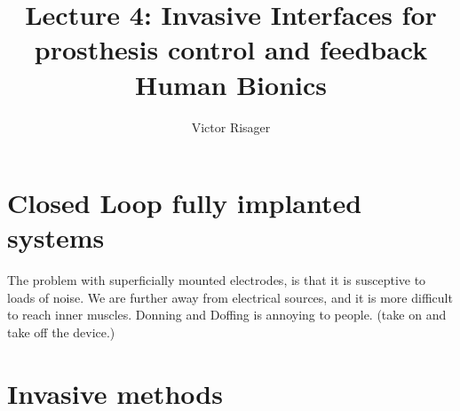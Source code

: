 \documentclass[a4paper]{article}
\title{Lecture 4: Invasive Interfaces for prosthesis control and feedback \\
	\large Human Bionics}
\author{Victor Risager}
\begin{document}
\maketitle

\section{Closed Loop fully implanted systems}
The problem with superficially mounted electrodes, is that it is susceptive to loads of noise. We are further away from electrical sources, and it is more difficult to reach inner muscles. 
Donning and Doffing is annoying to people.  (take on and take off the device.)

\section{Invasive methods}
\end{document}
